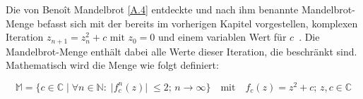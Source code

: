 
Die von Benoît Mandelbrot \hyperref[app:4]{[A.4]} entdeckte und nach ihm benannte
Mandelbrot-Menge befasst sich mit der bereits im vorherigen Kapitel vorgestellen,
komplexen Iteration \(z_{n+1} = z_n^2 + c \text{ mit } z_0 = 0\) und einem variablen
Wert für \(c\)~\cite*[S.25]{schuh_fraktale_2017}.
Die Mandelbrot-Menge enthält dabei alle Werte dieser Iteration, die beschränkt sind.
Mathematisch wird die Menge wie folgt definiert:

\[
  \mathbb{M} = \{c \in \mathbb{C} \; |\;  \forall n \in \mathbb{N}:\; |f_c^n(z)|\; \leqslant 2;\, n \to \infty\}
  \quad
  \text{mit}
  \quad
  f_c(z) = z^2 + c;\, z,c \in \mathbb{C}
\]